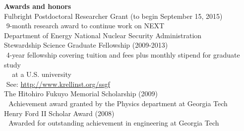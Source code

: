 {\noindent\textbf{Awards and honors}}\\

\indent\hspace{0.2 cm}Fulbright Postdoctoral Researcher Grant (to begin September 15, 2015)\\
\indent\hspace{0.2 cm}\hspace{0.6 cm}\textbullet\,\,9-month research award to continue work on NEXT\\

\indent\hspace{0.2 cm}Department of Energy National Nuclear Security Administration\\
\indent\hspace{0.2 cm}Stewardship Science Graduate Fellowship (2009-2013)\\
\indent\hspace{0.2 cm}\hspace{0.6 cm}\textbullet\,\,4-year fellowship covering tuition and fees plus monthly stipend for graduate study\\
\indent\hspace{0.2 cm}\hspace{0.6 cm}\,\,\,\,\,\,\,at a U.S. university\\
\indent\hspace{0.2 cm}\hspace{0.6 cm}\textbullet\,\,See: \href{http://www.krellinst.org/ssgf}{http://www.krellinst.org/ssgf}\\

\indent\hspace{0.2 cm}The Hitohiro Fukuyo Memorial Scholarship (2009)\\
\indent\hspace{0.2 cm}\hspace{0.6 cm}\textbullet\,\, Achievement award granted by the Physics department at Georgia Tech\\

\indent\hspace{0.2 cm}Henry Ford II Scholar Award (2008)\\ %
\indent\hspace{0.2 cm}\hspace{0.6 cm}\textbullet\,\, Awarded for outstanding achievement in engineering at Georgia Tech\\

